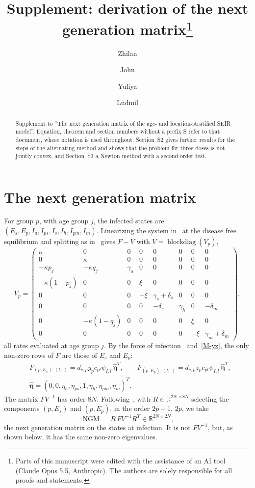 \documentclass[11pt]{article}
\title{Supplement: derivation of the next generation matrix\thanks{Parts of this manuscript were edited with the assistance of an AI tool (Claude Opus 5.5, Anthropic). The authors are solely responsible for all proofs and statements.}}
\author{Zhilan \and John \and Yuliya \and Ludmil}
\date{}
\theoremstyle{plain}
\theoremstyle{remark}
\numberwithin{equation}{section}
\begin{document}
\maketitle

\begin{abstract}
Supplement to ``The next generation matrix of the age- and location-stratified
SEIR model''. Equation, theorem and section numbers without a prefix S refer
to that document, whose notation is used throughout. Section~S2 gives
further results for the steps of the alternating method and shows that the
problem for three doses is not jointly convex, and Section~S3 a Newton method
with a second order test.
\end{abstract}

\section{The next generation matrix}\label{s-ngm}

For group $p$, with age group $j$, the infected states are
$(E_s,E_p,I_a,I_{ps},I_s,I_h,I_{pm},I_m)$. Linearizing the system
in~\cite{2026Feng_Day_Glasser} at the disease free equilibrium and splitting as
in~\cite{2002vdDriessche_Watmough} gives $F-V$ with $V=\operatorname{blockdiag}(V_p)$,
\begin{equation}\label{vp}
V_p=\begin{pmatrix}
\kappa&0&0&0&0&0&0&0\\
0&\kappa&0&0&0&0&0&0\\
-\kappa p_j&-\kappa q_j&\gamma_a&0&0&0&0&0\\
-\kappa(1-p_j)&0&0&\xi&0&0&0&0\\
0&0&0&-\xi&\gamma_s+\delta_s&0&0&0\\
0&0&0&0&-\delta_s&\gamma_h&0&-\delta_m\\
0&-\kappa(1-q_j)&0&0&0&0&\xi&0\\
0&0&0&0&0&0&-\xi&\gamma_m+\delta_m
\end{pmatrix},
\end{equation}
all rates evaluated at age group $j$. By the force of infection~\cite[Section~2.1]{2026Feng_Day_Glasser}
and~\eqref{M-yz}, the
only non-zero rows of $F$ are those of $E_s$ and $E_p$:
\begin{equation}\label{f-rows}
\begin{aligned}
&F_{(p,E_s),(l,\cdot)}=d_{c,p}y_pc_{pl}\psi_{I,l}\,\widehat{\bm\eta}^T,\qquad
F_{(p,E_p),(l,\cdot)}=d_{c,p}z_pc_{pl}\psi_{I,l}\,\widehat{\bm\eta}^T,\\
&\widehat{\bm\eta}=(0,0,\eta_a,\eta_{ps},1,\eta_h,\eta_{pm},\eta_m)^T .
\end{aligned}
\end{equation}
The matrix $FV^{-1}$ has order $8N$. Following~\cite{2010Diekmann_Heesterbeek_Roberts},
with $R\in\mathbb{R}^{2N\times 8N}$ selecting the components $(p,E_s)$ and
$(p,E_p)$, in the order $2p-1$, $2p$, we take
\begin{equation}\label{ngm-def}
\operatorname{NGM}=R\,FV^{-1}R^T\in\mathbb{R}^{2N\times 2N},
\end{equation}
the next generation matrix on the states at infection. It is not $FV^{-1}$,
but, as shown below, it has the same non-zero eigenvalues.
\end{document}

